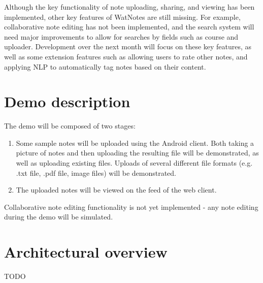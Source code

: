 \documentclass[12pt]{article}
\begin{document}
Although the key functionality of note uploading, sharing, and viewing has been implemented, other key features of WatNotes are still missing. For example, collaborative note editing has not been implemented, and the search system will need major improvements to allow for searches by fields such as course and uploader. Development over the next month will focus on these key features, as well as some extension features such as allowing users to rate other notes, and applying NLP to automatically tag notes based on their content.

\section{Demo description}
  The demo will be composed of two stages:
  \begin{enumerate}
    \item Some sample notes will be uploaded using the Android client. Both taking a picture of notes and then uploading the resulting file will be demonstrated, as well as uploading existing files. Uploads of several different file formats (e.g. .txt file, .pdf file, image files) will be demonstrated.

    \item The uploaded notes will be viewed on the feed of the web client.
  \end{enumerate}

  Collaborative note editing functionality is not yet implemented - any note editing during the demo will be simulated.

  \newpage

\section{Architectural overview}
TODO
\end{document}
